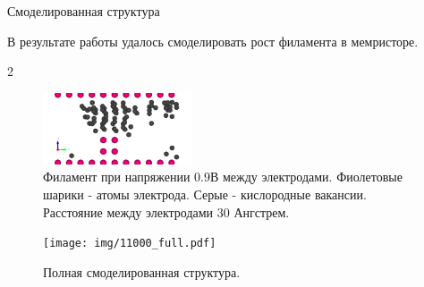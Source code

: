 \documentclass{beamer}%
\begin{document}




    




\begin{frame}{Смоделированная структура}{}

В результате работы удалось смоделировать рост филамента в мемристоре.

\begin {multicols} {2}
\begin{figure}
    \centering
    \includegraphics[height=80px]{img/11000.pdf}
    \caption{Филамент при напряжении 0.9В между электродами.
    Фиолетовые шарики - атомы электрода.
    Серые - кислородные вакансии.
    Расстояние между электродами 30 Ангстрем.
    }
\end{figure}
\columnbreak
\begin{figure}
    \centering
    \texttt{[image: img/11000\_full.pdf]}
    \caption{Полная смоделированная структура.
    }
\end{figure}
\end{multicols}
\end{frame}
\end{document}
